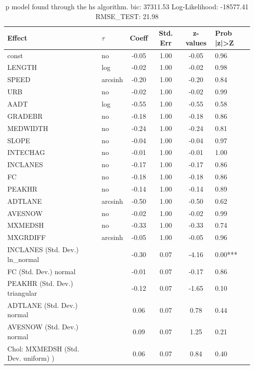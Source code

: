 \begin{table}
	\caption{p model found through the hs algorithm. bic: 37311.53 Log-Likelihood: -18577.41 RMSE_TEST: 21.98}
	\begin{center}
		\begin{tabular}{|l|l|c|c|c|l|}
			\hline
			Effect & $\tau$ & Coeff & Std. Err & z-values & Prob |z|>Z \\
			\hline
			const & no & -0.05 & 1.00 & -0.05 & 0.96 \\
			\hline
			LENGTH & log & -0.02 & 1.00 & -0.02 & 0.98 \\
			\hline
			SPEED & arcsinh & -0.20 & 1.00 & -0.20 & 0.84 \\
			\hline
			URB & no & -0.02 & 1.00 & -0.02 & 0.99 \\
			\hline
			AADT & log & -0.55 & 1.00 & -0.55 & 0.58 \\
			\hline
			GRADEBR & no & -0.18 & 1.00 & -0.18 & 0.86 \\
			\hline
			MEDWIDTH & no & -0.24 & 1.00 & -0.24 & 0.81 \\
			\hline
			SLOPE & no & -0.04 & 1.00 & -0.04 & 0.97 \\
			\hline
			INTECHAG & no & -0.01 & 1.00 & -0.01 & 1.00 \\
			\hline
			INCLANES & no & -0.17 & 1.00 & -0.17 & 0.86 \\
			\hline
			FC & no & -0.18 & 1.00 & -0.18 & 0.86 \\
			\hline
			PEAKHR & no & -0.14 & 1.00 & -0.14 & 0.89 \\
			\hline
			ADTLANE & arcsinh & -0.50 & 1.00 & -0.50 & 0.62 \\
			\hline
			AVESNOW & no & -0.02 & 1.00 & -0.02 & 0.99 \\
			\hline
			MXMEDSH & no & -0.33 & 1.00 & -0.33 & 0.74 \\
			\hline
			MXGRDIFF & arcsinh & -0.05 & 1.00 & -0.05 & 0.96 \\
			\hline
			INCLANES (Std. Dev.) ln_normal &  & -0.30 & 0.07 & -4.16 & 0.00*** \\
			\hline
			FC (Std. Dev.) normal &  & -0.01 & 0.07 & -0.17 & 0.86 \\
			\hline
			PEAKHR (Std. Dev.) triangular &  & -0.12 & 0.07 & -1.65 & 0.10 \\
			\hline
			ADTLANE (Std. Dev.) normal &  & 0.06 & 0.07 & 0.78 & 0.44 \\
			\hline
			AVESNOW (Std. Dev.) normal &  & 0.09 & 0.07 & 1.25 & 0.21 \\
			\hline
			 Chol: MXMEDSH (Std. Dev. uniform) ) &  & 0.06 & 0.07 & 0.84 & 0.40 \\

\end{tabular}
\end{center}
\end{table}
